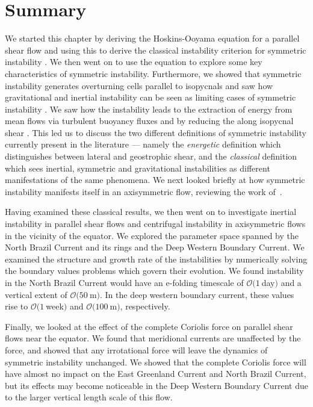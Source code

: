 \section{Summary}
We started this chapter by deriving the Hoskins-Ooyama equation for a parallel shear flow and using this to derive the classical instability criterion for symmetric instability \citep{Ooyama1966, Stone1966, Hoskins1974}. We then went on to use the equation to explore some key characteristics of symmetric instability. Furthermore, we showed that symmetric instability generates overturning cells parallel to isopycnals and saw how gravitational and inertial instability can be seen as limiting cases of symmetric instability \citep{Xu1985, emanuelSlantwiseConvection1994}. We saw how the instability leads to the extraction of energy from mean flows via turbulent buoyancy fluxes and by reducing the along isopycnal shear \citep{Haine1998, Thomas2013}. This led us to discuss the two different definitions of symmetric instability currently present in the literature --- namely the \textit{energetic} definition which distinguishes between lateral and geostrophic shear, and the \textit{classical} definition which sees inertial, symmetric and gravitational instabilities as different manifestations of the same phenomena. We next looked briefly at how symmetric instability manifests itself in an axisymmetric flow, reviewing the work of~\citet{Buckingham2021}.

Having examined these classical results, we then went on to investigate inertial instability in parallel shear flows and centrifugal instability in axisymmetric flows in the vicinity of the equator. We explored the parameter space spanned by the North Brazil Current and its rings and the Deep Western Boundary Current. We examined the structure and growth rate of the instabilities by numerically solving the boundary values problems which govern their evolution. We found instability in the North Brazil Current would have an e-folding timescale of $\mathcal{O}(1~$day$)$ and a vertical extent of $\mathcal{O}(50~$m$)$. In the deep western boundary current, these values rise to $\mathcal{O}(1~$week$)$ and $\mathcal{O}(100~$m$)$, respectively.

Finally, we looked at the effect of the complete Coriolis force on parallel shear flows near the equator. We found that meridional currents are unaffected by the force, and showed that any irrotational force will leave the dynamics of symmetric instability unchanged. We showed that the complete Coriolis force will have almost no impact on the East Greenland Current and North Brazil Current, but its effects may become noticeable in the Deep Western Boundary Current due to the larger vertical length scale of this flow.
